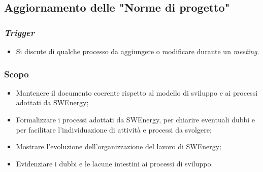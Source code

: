 \subsection{Aggiornamento delle "Norme di progetto"}
\label{aggiornare-ndp}

\subsubsection{\textit{Trigger}}
\begin{itemize}
	\item Si discute di qualche processo da aggiungere o modificare durante un
	      \textit{meeting}.
\end{itemize}

\subsubsection{Scopo}
\begin{itemize}
	\item Mantenere il documento coerente rispetto al modello di sviluppo e ai
	      processi adottati da SWEnergy;

	\item Formalizzare i processi adottati da SWEnergy, per chiarire eventuali
	      dubbi e per facilitare l'individuazione di attività e processi da
	      svolgere;

	\item Mostrare l'evoluzione dell'organizzazione del lavoro di SWEnergy;

	\item Evidenziare i dubbi e le lacune intestini ai processi di sviluppo.
\end{itemize}

